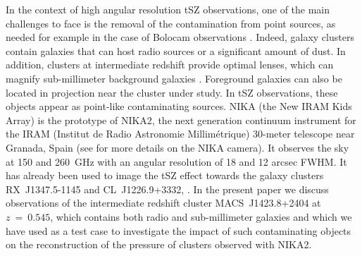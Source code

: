 \documentclass[twocolumn,traditabstract]{aa}
\begin{document}
In the context of high angular resolution tSZ observations, one of the main challenges to face is the removal of the contamination from point sources, as needed for example in the case of Bolocam observations \citep{sayers2013a}. Indeed, galaxy clusters contain galaxies that can host radio sources or a significant amount of dust. In addition, clusters at intermediate redshift provide optimal lenses, which can magnify sub-millimeter background galaxies \citep[see e.g.][]{adam2014}. Foreground galaxies can also be located in projection near the cluster under study. In tSZ observations, these objects appear as point-like contaminating sources. NIKA (the New IRAM Kids Array) is the prototype of NIKA2, the next generation continuum instrument for the IRAM (Institut de Radio Astronomie Millim\'etrique) 30-meter telescope near Granada, Spain (see \citealt{monfardini2010,bourion2011,bourrion2012,monfardini2011,calvo2012,catalano2014} for more details on the NIKA camera). It observes the sky at 150 and 260~GHz with an angular resolution of 18 and 12 arcsec FWHM. It has already been used to image the tSZ effect towards the galaxy clusters \mbox{RX~J1347.5-1145} and \mbox{CL~J1226.9+3332}, \citep[see][]{adam2013,adam2014}. In the present paper we discuss observations of  the intermediate redshift cluster \mbox{MACS~J1423.8+2404} at $z~=~0.545$, which contains both radio and sub-millimeter galaxies and which we have used as a test case to investigate the impact of such contaminating objects on the reconstruction of the pressure of clusters observed with NIKA2. 
\end{document}
